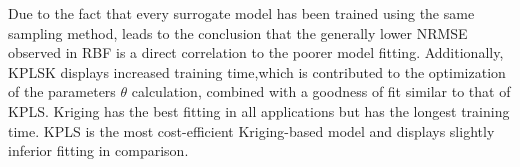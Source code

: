 \begin{table}[h!]
\centering
{}
\caption{Average NRMSE, the validation process is repeated 
$n_{test} \!= \!50$ times}
\label{table:3}
\end{table}

\begin{table}[h!]
\centering
{}
\caption{Average training time, the validation process is repeated 
$n_{test} \!= \!50$ times}
\label{table:2}
\end{table}

Due to the fact that every surrogate model has been trained
using the same sampling method, leads to the conclusion
that the generally lower NRMSE observed in RBF is a 
direct correlation to the poorer model fitting. Additionally, 
KPLSK displays increased training time,which is contributed to the 
optimization of the parameters $θ$ calculation, combined with a 
goodness of fit similar to that of KPLS. Kriging has the best 
fitting in all applications but has the longest training time. 
KPLS is the most cost-efficient Kriging-based model and displays 
slightly inferior fitting in comparison.

